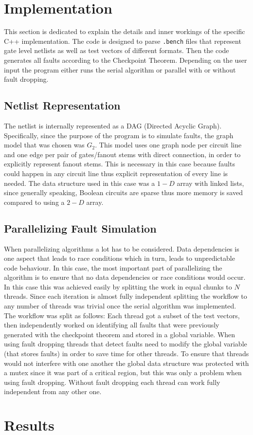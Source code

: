 \documentclass[a4paper,11pt]{article}
\begin{document}
\clearpage

\section*{Implementation}
This section is dedicated to explain the details and inner workings of the specific C++ implementation. The code is designed to parse \texttt{.bench} files that represent gate level netlists as well as test vectors of different formats. Then the code generates all faults according to the Checkpoint Theorem. Depending on the user input the program either runs the serial algorithm or parallel with or without fault dropping.

\subsection*{Netlist Representation}
The netlist is internally represented as a DAG (Directed Acyclic Graph). Specifically, since the purpose of the program is to simulate faults, the graph model that was chosen was $G_2$. This model uses one graph node per circuit line and one edge per pair of gates/fanout stems with direct connection, in order to explicitly represent fanout stems. This is necessary in this case because faults could happen in any circuit line thus explicit representation of every line is needed. The data structure used in this case was a $1-D$ array with linked lists, since generally speaking, Boolean circuits are sparse thus more memory is saved compared to using a $2-D$ array. 

\subsection*{Parallelizing Fault Simulation}
When parallelizing algorithms a lot has to be considered. Data dependencies is one aspect that leads to race conditions which in turn, leads to unpredictable code behaviour. In this case, the most important part of parallelizing the algorithm is to ensure that no data dependencies or race conditions would occur. In this case this was achieved easily by splitting the work in equal chunks to $N$ threads. Since each iteration is almost fully independent splitting the workflow to any number of threads was trivial once the serial algorithm was implemented. The workflow was split as follows: Each thread got a subset of the test vectors, then independently worked on identifying all faults that were previously generated with the checkpoint theorem and stored in a global variable. When using fault dropping threads that detect faults need to modify the global variable (that stores faults) in order to save time for other threads. To ensure that threads would not interfere with one another the global data structure was protected with a mutex since it was part of a critical region, but this was only a problem when using fault dropping. Without fault dropping each thread can work fully independent from any other one.

\clearpage 

\section*{Results}
\end{document}
